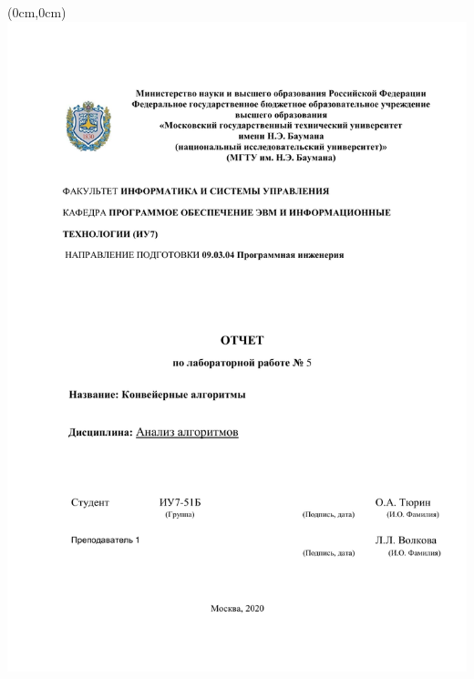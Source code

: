 \documentclass[12pt,a4paper]{article}
\numberwithin{equation}{section}
\begin{document}
	\begin{titlepage}
		\begin{textblock*}{13cm}(0cm,0cm)
			\includegraphics{reportTitle}
		\end{textblock*}
	\end{titlepage}
\hspace{0pt}
\clearpage
\tableofcontents
\clearpage
\end{document}
